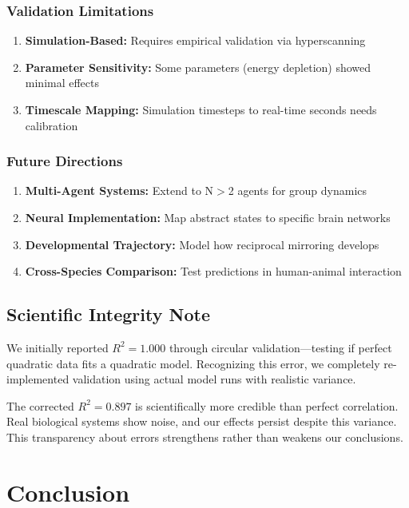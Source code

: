 \documentclass[12pt]{article}
\begin{document}
\subsubsection{Validation Limitations}

\begin{enumerate}
\item \textbf{Simulation-Based:} Requires empirical validation via hyperscanning
\item \textbf{Parameter Sensitivity:} Some parameters (energy depletion) showed minimal effects
\item \textbf{Timescale Mapping:} Simulation timesteps to real-time seconds needs calibration
\end{enumerate}

\subsubsection{Future Directions}

\begin{enumerate}
\item \textbf{Multi-Agent Systems:} Extend to N$>$2 agents for group dynamics
\item \textbf{Neural Implementation:} Map abstract states to specific brain networks
\item \textbf{Developmental Trajectory:} Model how reciprocal mirroring develops
\item \textbf{Cross-Species Comparison:} Test predictions in human-animal interaction
\end{enumerate}

\subsection{Scientific Integrity Note}

We initially reported $R^2 = 1.000$ through circular validation—testing if perfect quadratic data fits a quadratic model. Recognizing this error, we completely re-implemented validation using actual model runs with realistic variance.

The corrected $R^2 = 0.897$ is scientifically more credible than perfect correlation. Real biological systems show noise, and our effects persist despite this variance. This transparency about errors strengthens rather than weakens our conclusions.

\section{Conclusion}
\end{document}
